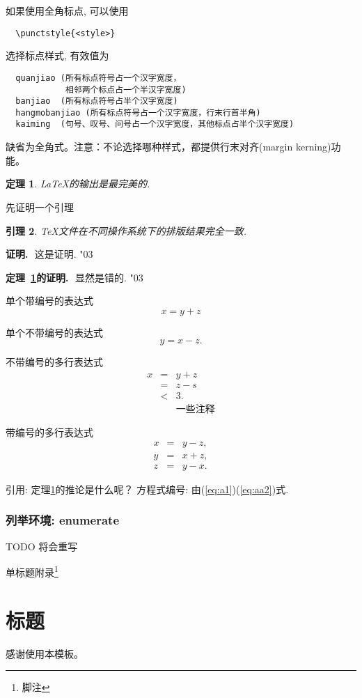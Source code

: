 \documentclass{nkuthesis}
\newtheorem{Theorem}{\hspace{2em}定理}[section]
\newtheorem{Lemma}[Theorem]{\hspace{2em}引理}
\begin{document}
如果使用全角标点, 可以使用
\begin{verbatim}
  \punctstyle{<style>}
\end{verbatim}
选择标点样式, 有效值为
\begin{verbatim}
  quanjiao (所有标点符号占一个汉字宽度，
            相邻两个标点占一个半汉字宽度)
  banjiao  (所有标点符号占半个汉字宽度)
  hangmobanjiao (所有标点符号占一个汉字宽度，行末行首半角)
  kaiming  (句号、叹号、问号占一个汉字宽度，其他标点占半个汉字宽度)
\end{verbatim}
缺省为全角式。注意：不论选择哪种样式，都提供行末对齐(margin kerning)功能。



\begin{Theorem} \label{thm:latex}
\LaTeX 的输出是最完美的.
\end{Theorem}

先证明一个引理
\begin{Lemma} \label{thm:tex}
\TeX 文件在不同操作系统下的排版结果完全一致.
\end{Lemma}

\newcommand{\proof}[1][证明]{\par\textbf{#1.}\,\, }
\def\endproof{\hfill{\char"03}}

\begin{proof}
这是证明.
\end{proof}


\begin{proof}[定理~\ref{thm:latex}的证明]
显然是错的.
\end{proof}

单个带编号的表达式
\begin{equation}\label{eq:a1}
x=y+z
\end{equation}

单个不带编号的表达式
\[
y=x-z.
\]

不带编号的多行表达式
\begin{eqnarray*}
x&=&y+z \\
 &=&z-s\\
 &<& 3. \\
 && \mbox{一些注释}
\end{eqnarray*}

带编号的多行表达式
\begin{eqnarray}
 x&=& y-z, \label{eq:aa1}\\
 y&=& x+z, \nonumber \\
 z&=&y-x. \label{eq:aa2}
\end{eqnarray}

引用:   定理\ref{thm:latex}的推论是什么呢？
方程式编号:  由(\ref{eq:a1})(\ref{eq:aa2})式.

\subsubsection{列举环境:  enumerate}

TODO 将会重写

\appendix
单标题附录\footnote{脚注}

\appendices
\section{标题}

\begin{reference}
\printbibliography[heading=none]
\end{reference}

\begin{acknowledgement}
  感谢使用本模板。
\end{acknowledgement}
\end{document}
